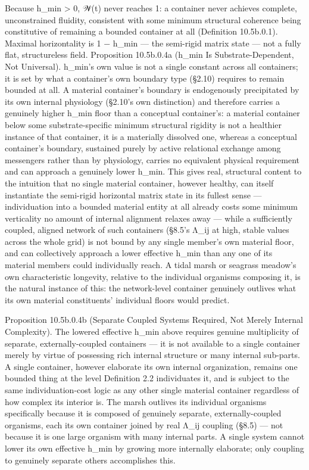 \documentclass[
]{article}
\begin{document}
Because h\_min \textgreater{} 0, 𝒲(t) never reaches 1: a container never
achieves complete, unconstrained fluidity, consistent with some minimum
structural coherence being constitutive of remaining a bounded container
at all (Definition 10.5b.0.1). Maximal horizontality is 1 − h\_min ---
the semi-rigid matrix state --- not a fully flat, structureless field.
Proposition 10.5b.0.4a (h\_min Is Substrate-Dependent, Not Universal).
h\_min's own value is not a single constant across all containers; it is
set by what a container's own boundary type (§2.10) requires to remain
bounded at all. A material container's boundary is endogenously
precipitated by its own internal physiology (§2.10's own distinction)
and therefore carries a genuinely higher h\_min floor than a conceptual
container's: a material container below some substrate-specific minimum
structural rigidity is not a healthier instance of that container, it is
a materially dissolved one, whereas a conceptual container's boundary,
sustained purely by active relational exchange among messengers rather
than by physiology, carries no equivalent physical requirement and can
approach a genuinely lower h\_min. This gives real, structural content
to the intuition that no single material container, however healthy, can
itself instantiate the semi-rigid horizontal matrix state in its fullest
sense --- individuation into a bounded material entity at all already
costs some minimum verticality no amount of internal alignment relaxes
away --- while a sufficiently coupled, aligned network of such
containers (§8.5's Λ\_ij at high, stable values across the whole grid)
is not bound by any single member's own material floor, and can
collectively approach a lower effective h\_min than any one of its
material members could individually reach. A tidal marsh or seagrass
meadow's own characteristic longevity, relative to the individual
organisms composing it, is the natural instance of this: the
network-level container genuinely outlives what its own material
constituents' individual floors would predict.

Proposition 10.5b.0.4b (Separate Coupled Systems Required, Not Merely
Internal Complexity). The lowered effective h\_min above requires
genuine multiplicity of separate, externally-coupled containers --- it
is not available to a single container merely by virtue of possessing
rich internal structure or many internal sub-parts. A single container,
however elaborate its own internal organization, remains one bounded
thing at the level Definition 2.2 individuates it, and is subject to the
same individuation-cost logic as any other single material container
regardless of how complex its interior is. The marsh outlives its
individual organisms specifically because it is composed of genuinely
separate, externally-coupled organisms, each its own container joined by
real Λ\_ij coupling (§8.5) --- not because it is one large organism with
many internal parts. A single system cannot lower its own effective
h\_min by growing more internally elaborate; only coupling to genuinely
separate others accomplishes this.
\end{document}
